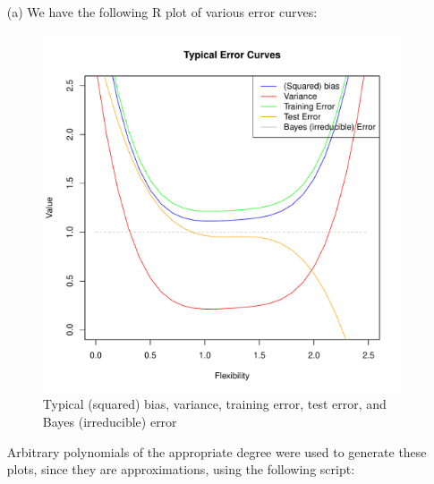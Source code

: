 
\begin{itemize}
    \item[(a)] We have the following R plot of various error curves:
    \begin{figure}[!ht]
        \includegraphics[scale=0.6, center]{./plots/ex2_3_a.pdf}
        \caption{
            Typical (squared) bias, variance, training error, test error, and Bayes 
            (irreducible) error
        }\label{fig:figure1}
    \end{figure}
    Arbitrary polynomials of the appropriate degree were used to generate these 
    plots, since they are approximations, using the following script:
    \begin{verbatim}
    \end{verbatim}
\end{itemize}
